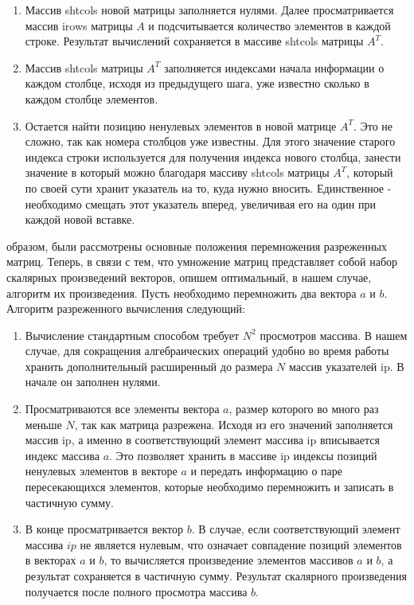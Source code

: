 \documentclass{report}
\begin{document}
\begin{enumerate}
    \item Массив shtcols новой матрицы заполняется нулями. Далее просматривается массив irows матрицы $A$ и подсчитывается количество элементов в каждой строке. Результат вычислений сохраняется в массиве shtcols матрицы $A^T$.
    \item Массив shtcols матрицы $A^T$ заполняется индексами начала информации о каждом столбце, исходя из предыдущего шага, уже известно сколько в каждом столбце элементов.
    \item Остается найти позицию ненулевых элементов в новой матрице $A^T$. Это не сложно, так как номера столбцов уже известны. Для этого значение старого индекса строки используется для получения индекса нового столбца, занести значение в который можно благодаря массиву shtcols матрицы $A^T$, который по своей сути хранит указатель на то, куда нужно вносить. Единственное - необходимо смещать этот указатель вперед, увеличивая его на один при каждой новой вставке.
\end{enumerate}

 образом, были рассмотрены основные положения перемножения разреженных матриц. Теперь, в связи с тем, что умножение матриц представляет собой набор скалярных произведений векторов, опишем оптимальный, в нашем случае, алгоритм их произведения. Пусть необходимо перемножить два вектора $a$ и $b$. Алгоритм разреженного вычисления следующий:

\begin{enumerate}
    \item Вычисление стандартным способом требует $N^2$ просмотров массива. В нашем случае, для сокращения алгебраических операций удобно во время работы хранить дополнительный расширенный до размера $N$ массив указателей ip. В начале он заполнен нулями.
    \item Просматриваются все элементы вектора $a$, размер которого во много раз меньше $N$, так как матрица разрежена. Исходя из его значений заполняется массив ip, а именно в соответствующий элемент массива ip вписывается индекс массива $a$. Это позволяет хранить в массиве ip индексы позиций ненулевых элементов в векторе $a$ и передать информацию о паре пересекающихся элементов, которые необходимо перемножить и записать в частичную сумму.
    \item В конце просматривается вектор $b$. В случае, если соответствующий элемент массива $ip$ не является нулевым, что означает совпадение позиций элементов в векторах $a$ и $b$, то вычисляется произведение элементов массивов $a$ и $b$, а результат сохраняется в частичную сумму. Результат скалярного произведения получается после полного просмотра массива $b$.
\end{enumerate}
\end{document}
